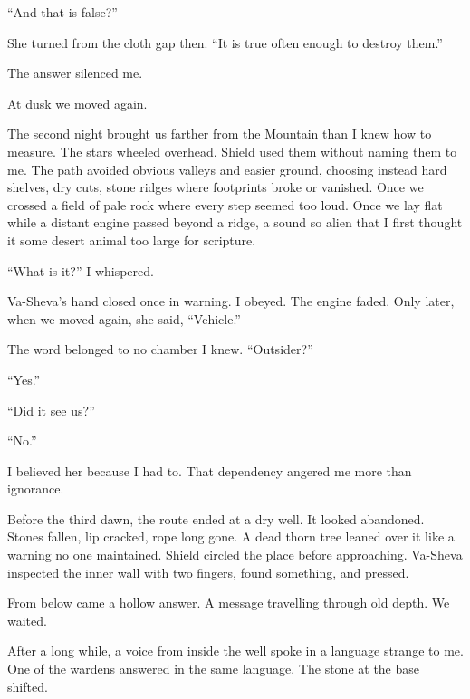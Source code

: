 ``And that is false?''\par

She turned from the cloth gap then. ``It is true often enough to destroy them.''\par

The answer silenced me.\par

At dusk we moved again.\par

The second night brought us farther from the Mountain than I knew how to measure. The stars wheeled overhead. Shield used them without naming them to me. The path avoided obvious valleys and easier ground, choosing instead hard shelves, dry cuts, stone ridges where footprints broke or vanished. Once we crossed a field of pale rock where every step seemed too loud. Once we lay flat while a distant engine passed beyond a ridge, a sound so alien that I first thought it some desert animal too large for scripture.\par

``What is it?'' I whispered.\par

Va-Sheva's hand closed once in warning. I obeyed. The engine faded. Only later, when we moved again, she said, ``Vehicle.''\par

The word belonged to no chamber I knew. ``Outsider?''\par

``Yes.''\par

``Did it see us?''\par

``No.''\par

I believed her because I had to. That dependency angered me more than ignorance.\par

Before the third dawn, the route ended at a dry well. It looked abandoned. Stones fallen, lip cracked, rope long gone. A dead thorn tree leaned over it like a warning no one maintained. Shield circled the place before approaching. Va-Sheva inspected the inner wall with two fingers, found something, and pressed.\par

From below came a hollow answer. A message travelling through old depth. We waited.\par

After a long while, a voice from inside the well spoke in a language strange to me. One of the wardens answered in the same language. The stone at the base shifted.\par

